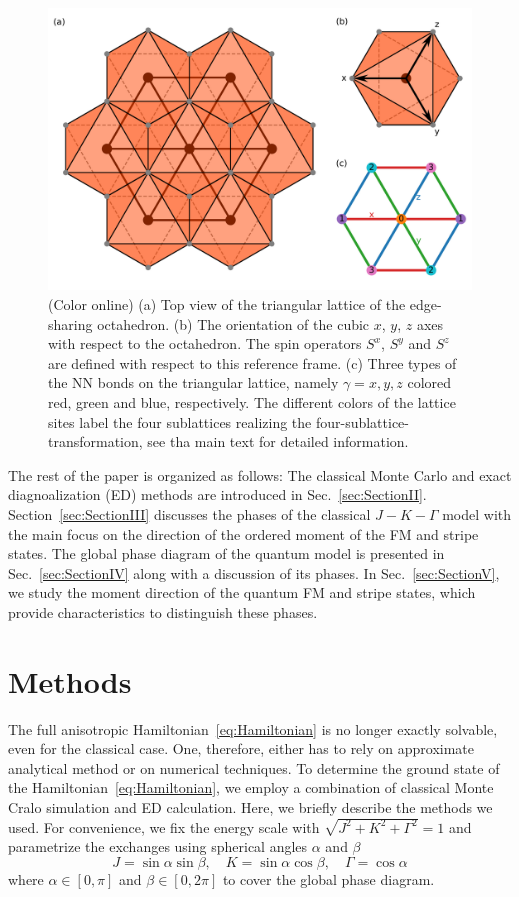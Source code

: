 \documentclass[aps,prb,reprint,amsfonts,amsmath,amssymb,showpacs,groupedaddress,superscriptaddress]{revtex4-1}
\begin{document}
\begin{figure}
    \includegraphics[width=\columnwidth]{Fig1.pdf}
    \caption{\label{fig:ModelDefinition}(Color online) (a) Top view of the triangular lattice of the edge-sharing octahedron. (b) The orientation of the cubic $x$, $y$, $z$ axes with respect to the octahedron. The spin operators $S^x$, $S^y$ and $S^z$ are defined with respect to this reference frame. (c) Three types of the NN bonds on the triangular lattice, namely $\gamma=x, y, z$ colored red, green and blue, respectively. The different colors of the lattice sites label the four sublattices realizing the four-sublattice-transformation, see tha main text for detailed information.}
\end{figure}

The rest of the paper is organized as follows: The classical Monte Carlo and exact diagnoalization (ED) methods are introduced in Sec.~\ref{sec:SectionII}. Section~\ref{sec:SectionIII} discusses the phases of the classical $J-K-\Gamma$ model with the main focus on the direction of the ordered moment of the FM and stripe states. The global phase diagram of the quantum model is presented in Sec.~\ref{sec:SectionIV} along with a discussion of its phases. In Sec.~\ref{sec:SectionV}, we study the moment direction of the quantum FM and stripe states, which provide characteristics to distinguish these phases.

\section{\label{sec:SectionII}Methods}
The full anisotropic Hamiltonian~\eqref{eq:Hamiltonian} is no longer exactly solvable, even for the classical case. One, therefore, either has to rely on approximate analytical method or on numerical techniques. To determine the ground state of the Hamiltonian~\eqref{eq:Hamiltonian}, we employ a combination of classical Monte Cralo simulation and ED calculation. Here, we briefly describe the methods we used. For convenience, we fix the energy scale with $\sqrt{J^2 + K^2 + \Gamma^2}=1$ and parametrize the exchanges using spherical angles $\alpha$ and $\beta$
\begin{equation}
    J = \sin\alpha \sin\beta, \quad
    K = \sin\alpha \cos\beta, \quad
    \Gamma = \cos\alpha \label{eq:Parameters}
\end{equation}
where $\alpha \in [0, \pi]$ and $\beta \in [0, 2\pi]$ to cover the global phase diagram.
\end{document}

